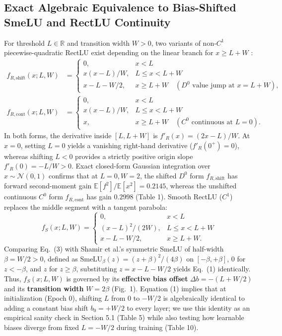 \documentclass[11pt, a4paper]{article}
\begin{document}
\subsection{Exact Algebraic Equivalence to Bias-Shifted SmeLU and RectLU Continuity}
For threshold $L \in \mathbb{R}$ and transition width $W > 0$, two variants of non-$C^{1}$ piecewise-quadratic RectLU exist depending on the linear branch for $x \ge L+W$ \cite{ref15}:
\begin{equation}
\begin{aligned}
f_{R,\text{shift}}(x; L, W) &= \begin{cases} 0, & x < L \\ x(x-L)/W, & L \le x < L+W \\ x - L - W/2, & x \ge L+W \quad (D^{0}\text{ value jump at } x = L+W), \end{cases} \\
f_{R,\text{cont}}(x; L, W) &= \begin{cases} 0, & x < L \\ x(x-L)/W, & L \le x < L+W \\ x, & x \ge L+W \quad (C^{0}\text{ continuous at } L=0). \end{cases}
\end{aligned}
\end{equation}
In both forms, the derivative inside $[L, L+W]$ is $f'_{R}(x) = (2x - L)/W$. At $x = 0$, setting $L = 0$ yields a vanishing right-hand derivative ($f'_{R}(0^{+}) = 0$), whereas shifting $L < 0$ provides a strictly positive origin slope $f'_{R}(0) = -L/W > 0$. Exact closed-form Gaussian integration over $x \sim \mathcal{N}(0,1)$ confirms that at $L=0, W=2$, the shifted $D^{0}$ form $f_{R,\text{shift}}$ has forward second-moment gain $\mathbb{E}[f^{2}]/\mathbb{E}[x^{2}] = 0.2145$, whereas the unshifted continuous $C^{0}$ form $f_{R,\text{cont}}$ has gain $0.2998$ (Table 1). Smooth RectLU ($C^{1}$) replaces the middle segment with a tangent parabola:
\begin{equation}
f_{S}(x; L, W) = \begin{cases} 0, & x < L \\ (x-L)^{2}/(2W), & L \le x < L+W \\ x-L-W/2, & x \ge L+W. \end{cases}
\end{equation}
Comparing Eq.\ (3) with Shamir et al.'s symmetric SmeLU \cite{ref41} of half-width $\beta = W/2 > 0$, defined as $\text{SmeLU}_{\beta}(z) = (z+\beta)^{2}/(4\beta)$ on $[-\beta, +\beta]$, $0$ for $z < -\beta$, and $z$ for $z \ge \beta$, substituting $z = x - L - W/2$ yields Eq.\ (1) identically. Thus, $f_{S}(x; L, W)$ is governed by its \textbf{effective bias offset} $\Delta b = -(L + W/2)$ and its \textbf{transition width} $W = 2\beta$ (Fig.\ 1). Equation (1) implies that at initialization (Epoch 0), shifting $L$ from $0$ to $-W/2$ is algebraically identical to adding a constant bias shift $b_{0} = +W/2$ to every layer; we use this identity as an empirical sanity check in Section 5.1 (Table 5) while also testing how learnable biases diverge from fixed $L = -W/2$ during training (Table 10).
\end{document}
